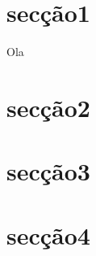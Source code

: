 \documentclass[12pt]{article}
\begin{document}
	



\section{secção1}
    Ola    
\section{secção2}

\section{secção3}

\section{secção4}
\end{document}

